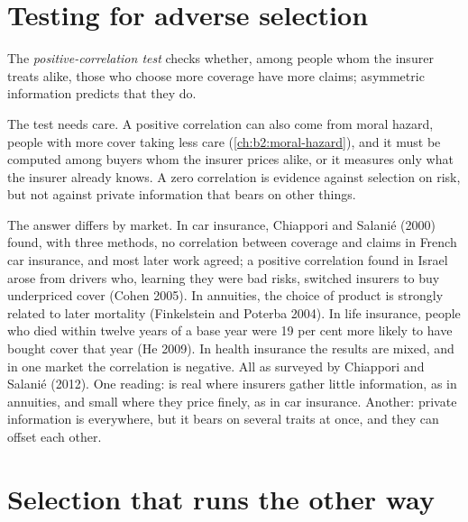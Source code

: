\section{Testing for adverse selection}\label{sec:b2:adverse-selection:testing}

\begin{definition}\label{def:b2:adverse-selection:positive-correlation}
The \emph{positive-correlation test} checks whether, among people whom the insurer
treats alike, those who choose more coverage have more claims; asymmetric information predicts that they do.
\end{definition}

The test needs care. A positive correlation can also come from moral hazard, people with more cover taking less care
(\cref{ch:b2:moral-hazard}), and it must be computed among buyers whom the insurer prices alike, or it measures only
what the insurer already knows. A zero correlation is evidence against selection on risk, but not against private
information that bears on other things.

\begin{debate}
The answer differs by market. In car insurance, Chiappori and Salani\'e (2000) found, with three methods, no correlation
between coverage and claims in French car insurance, and most later work agreed; a positive correlation found in
Israel arose from drivers who, learning they were bad risks, switched insurers to buy underpriced cover (Cohen 2005). In
annuities, the choice of product is strongly related to later mortality (Finkelstein and Poterba 2004). In life insurance,
people who died within twelve years of a base year were 19 per cent more likely to have bought cover that year (He 2009). In
health insurance the results are mixed, and in one market the correlation is negative. All as surveyed by Chiappori and
Salani\'e (2012). One reading:  is real where insurers gather little information, as in annuities, and
small where they price finely, as in car insurance. Another: private information is everywhere, but it bears on several
traits at once, and they can offset each other.
\end{debate}

\section{Selection that runs the other way}\label{sec:b2:adverse-selection:advantageous}


